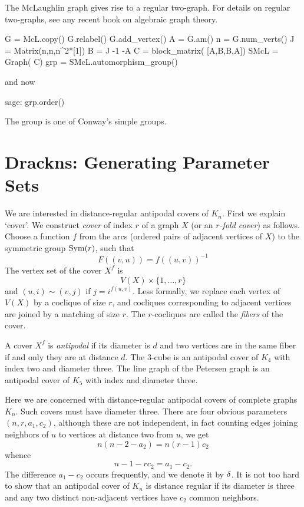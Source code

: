 The McLaughlin graph gives rise to a regular two-graph. For details on regular
two-graphs, see any recent book on algebraic graph theory. 
\begin{sageblock}
    G = McL.copy()
    G.relabel()
    G.add_vertex()
    A = G.am()
    n = G.num_verts()
    J = Matrix(n,n,n^2*[1])
    B = J -1 -A
    C = block_matrix( [A,B,B,A])
    SMcL = Graph( C)
    grp = SMcL.automorphism_group()
\end{sageblock}
and now
\begin{sageexample}
sage: grp.order()
\end{sageexample}
The group is one of Conway's simple groups.



\section{Drackns: Generating Parameter Sets}

We are interested in distance-regular antipodal covers of $K_n$.
First we explain `cover'. We construct \textsl{cover} of
index $r$ of a graph $X$ (or an \textsl{$r$-fold cover})
as follows. Choose a function $f$ from the arcs (ordered pairs of adjacent
vertices of $X$) to the symmetric group $\operatorname{Sym}(r)$, such that
\[
    F((v,u)) =f((u,v))^{-1}
\]
The vertex set of the cover $X^f$ is 
\[
    V(X)\times \{1,\ldots,r\}
\]
and $(u,i)\sim (v,j)$ if $j = i^{f(u,v)}$. Less formally, we replace each
vertex of $V(X)$ by a coclique of size $r$, and cocliques corresponding
to adjacent vertices are joined by a matching of size $r$. The $r$-cocliques
are called the \textsl{fibers} of the cover.

A cover $X^f$ is \textsl{antipodal} if its diameter is $d$ and two vertices
are in the same fiber if and only they are at distance $d$. The 3-cube is an antipodal
cover of $K_4$ with index two and diameter three. The line graph of the Petersen
graph is an antipodal cover of $K_5$ with index and diameter three.

Here we are concerned with distance-regular antipodal covers of complete graphs $K_n$.
Such covers must have diameter three. There are four obvious parameters $(n,r,a_1,c_2)$,
although these are not independent, in fact counting edges joining neighbors
of $u$ to vertices at distance two from $u$, we get
\[
    n(n-2-a_2) = n(r-1)c_2
\]
whence
\begin{equation}
\label{eq:n1rc2}
    n-1-rc_2 = a_1-c_2.
\end{equation}
The difference $a_1-c_2$ occurs frequently, and we denote it by $\delta$.
It is not too hard to show that an antipodal
cover of $K_n$ is distance regular if its diameter is three and any two 
distinct non-adjacent vertices have $c_2$ common neighbors.

